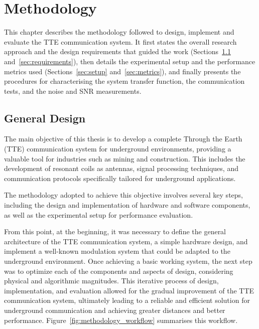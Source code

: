 \chapter{Methodology}\label{ch:methodology}

This chapter describes the methodology followed to design, implement and
evaluate the TTE communication system. It first states the overall research
approach and the design requirements that guided the work
(Sections~\ref{sec:general_design} and~\ref{sec:requirements}), then details the
experimental setup and the performance metrics used
(Sections~\ref{sec:setup} and~\ref{sec:metrics}), and finally presents the
procedures for characterising the system transfer function, the communication
tests, and the noise and SNR measurements.

\section{General Design}\label{sec:general_design}

The main objective of this thesis is to develop a complete Through the Earth (TTE) communication system for underground environments, providing a valuable tool for industries such as mining and construction. This includes the development of resonant coils as antennas, signal processing techniques, and communication protocols specifically tailored for underground applications.
\newp

The methodology adopted to achieve this objective involves several key steps, including the design and implementation of hardware and software components, as well as the experimental setup for performance evaluation.

\newp
From this point, at the beginning, it was necessary to define the general architecture of the TTE communication system, a simple hardware design, and implement a well-known modulation system that could be adapted to the underground environment. Once achieving a basic working system, the next step was to optimize each of the components and aspects of design, considering physical and algorithmic magnitudes. This iterative process of design, implementation, and evaluation allowed for the gradual improvement of the TTE communication system, ultimately leading to a reliable and efficient solution for underground communication and achieving greater distances and better performance. Figure~\ref{fig:methodology_workflow} summarises this workflow.


